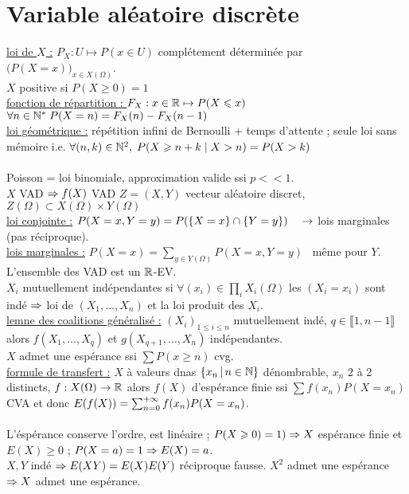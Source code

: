 \documentclass[12 pt]{book}
\begin{document}
\section*{Variable aléatoire discrète}
\underline{loi de $X$ :} $P_X : U\mapsto P(x\in U)$ \qquad complétement déterminée par $\big(P(X=x)\big)_{x\in X(\Omega)}$.\\
$X$ positive si $P(X\geqslant0) =1$\\
\underline{fonction de répartition : } $F_X : x\in\mathbb{R} \mapsto P(X\leqslant x)$ \quad $\forall n\in \mathbb{N}^*\; P(X=n)=F_X(n)-F_X(n-1)$\\
\underline{loi géométrique :} répétition infini de Bernoulli + temps d'attente ; seule loi sans mémoire i.e. $\forall (n,k)\in \mathbb{N}^2, \; P(X\geqslant n+k \;|\; X> n) = P(X>k)$\\
\text{}\\
Poisson = loi binomiale, approximation valide ssi $p<<1$.\\
$X$ VAD  $\Rightarrow f(X)$ VAD \quad $Z=(X,Y)$ vecteur aléatoire discret, $Z(\Omega)\subset X(\Omega)\times Y(\Omega)$\\
\underline{loi conjointe :} $P(X=x,Y=y) = P(\{X=x\}\cap \{Y=y\}) \quad \rightarrow$ lois marginales (pas réciproque).\\
\underline{lois marginales :} $P(X=x)=\sum_{y\in Y(\Omega)} P(X=x,Y=y)$ \ même pour $Y$.\\
L'ensemble des VAD est un $\mathbb{R}$-EV.\\
$X_i$ mutuellement indépendantes si $\forall (x_i)\in \prod_i X_i(\Omega)$ les $(X_i=x_i)$ sont indé $\Rightarrow$ loi de $(X_1,\dots,X_n)$ et la loi produit des $X_i$.\\
\underline{lemne des coalitions généralisé :} $(X_i)_{1\leqslant i\leqslant n}$ mutuellement indé, $q\in \llbracket 1,n-1\rrbracket$ alors $f(X_1,\dots,X_q)$ et $g(X_{q+1},\dots,X_n)$ indépendantes.\\
$X$ admet une espérance ssi $\sum P(x\geqslant n)$ cvg.\\
\underline{formule de transfert :} $X$ à valeurs dnas $\{x_n \, |\, n\in\mathbb{N}\}$ dénombrable, $x_n$ 2 à 2 distincts, $f:X(\Omega)\to \mathbb{R}$ alors $f(X)$ d'espérance finie ssi $\sum f(x_n) P(X=x_n)$ CVA et donc $E(f(X)) = \sum_{n=0}^{+\infty} f(x_n)P(X=x_n)$.\\
\text{}\\
L'éspérance conserve l'ordre, est linéaire ; $P(X\geqslant 0) =1) \Rightarrow X$ espérance finie et $E(X)\geqslant 0$ ; $P(X=a) =1 \Rightarrow E(X)=a$.\\
$X,Y$ indé $\Rightarrow E(XY)=E(X)E(Y)$ réciproque fausse. $X^2$ admet une espérance $\Rightarrow X$ admet une espérance.\\
\end{document}
